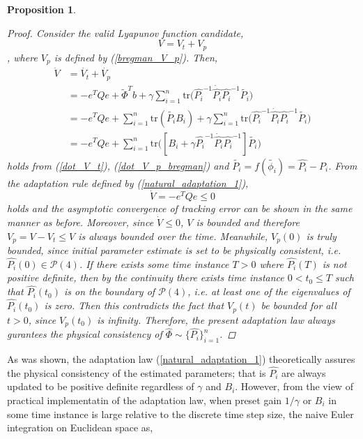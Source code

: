 \documentclass[letterpaper, 10 pt, conference]{ieeeconf}  %
\newtheorem{proposition}{Proposition}
\newtheorem{remark}{Remark}
\begin{document}
\begin{proposition}
\begin{proof}
Consider the valid Lyapunov function candidate,
\begin{equation*}
V = V_t + V_p
\end{equation*}
, where $V_p$ is defined by (\ref{bregman_V_p}). Then,
\begin{align*}
\dot{V} &= \dot{V_t} + \dot{V_p}\\
 &= -e^{T}Qe + \tilde{\Phi}^{T}b + \gamma\sum_{i=1}^n \mathrm{tr}\big(\hat{P_i}^{-1}\dot{\hat{P_i}}\hat{P_i}^{-1}\tilde{P_i}\big)\\
 &=-e^{T}Qe + \sum_{i=1}^n\mathrm{tr}(\tilde{P_i}B_i) + \gamma\sum_{i=1}^n \mathrm{tr}\big(\hat{P_i}^{-1}\dot{\hat{P_i}}\hat{P_i}^{-1}\tilde{P_i}\big)\\
 &= -e^{T}Qe + \sum_{i=1}^n \mathrm{tr}\big([B_i +\gamma\hat{P_i}^{-1}\dot{\hat{P_i}}\hat{P_i}^{-1}]\tilde{P_i}\big)
\end{align*}
holds from (\ref{dot_V_t}), (\ref{dot_V_p_bregman}) and $\tilde{P_i} = f(\tilde{\phi_i}) = \hat{P_i}-P_i$. From the adaptation rule defined by (\ref{natural_adaptation_1}),
\begin{equation*}
\dot{V} = -e^{T}Qe \leq 0
\end{equation*}
holds and the asymptotic convergence of tracking error can be shown in the same manner as before. Moreover, since $\dot{V} \leq 0$, $V$ is bounded and therefore $V_p = V - V_t \leq V$ is always bounded over the time. Meanwhile, $V_p(0)$ is truly bounded, since initial parameter estimate is set to be physically consistent, i.e. $\hat{P_i}(0) \in \mathcal{P}(4)$. If there exists some time instance $T>0$ where $\hat{P_i}(T)$ is not positive definite, then by the continuity there exists time instance $0<t_0\leq T$ such that $\hat{P_i}(t_0)$ is on the boundary of $\mathcal{P}(4)$, i.e. at least one of the eigenvalues of $\hat{P_i}(t_0)$ is zero. Then this contradicts the fact that $V_p(t)$ be bounded for all $t>0$, since $V_p(t_0)$ is infinity. Therefore, the present adaptation law always gurantees the physical consistency of $\hat{\Phi} \sim \{\hat{P_i}\}_{i=1}^n$.
\end{proof}
\end{proposition}
As was shown, the adaptation law (\ref{natural_adaptation_1}) theoretically assures the physical consistency of the estimated parameters; that is $\hat{P_i}$ are always updated to be positive definite regardless of $\gamma$ and $B_{i}$. However, from the view of practical implementatin of the adaptation law, when preset gain $1/\gamma$ or $B_{i}$ in some time instance is large relative to the discrete time step size, the naive Euler integration on Euclidean space as,
\end{document}
